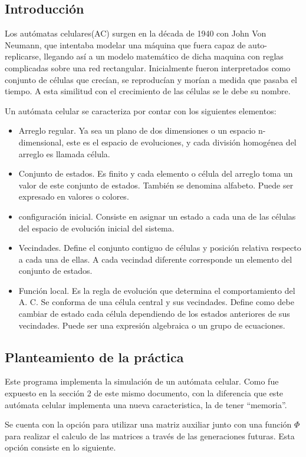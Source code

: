 \subsection{Introducción}
	Los autómatas celulares(AC) surgen en la década de 1940 con John Von Neumann, que intentaba modelar una máquina que fuera capaz de auto-replicarse, llegando así a un modelo matemático de dicha maquina con reglas complicadas sobre una red rectangular. Inicialmente fueron interpretados como conjunto de células que crecían, se reproducían y morían a medida que pasaba el tiempo. A esta similitud con el crecimiento de las células se le debe su nombre.\cite{PAGINA}

	Un autómata celular se caracteriza por contar con los siguientes elementos:
	\begin{itemize}
		\item Arreglo regular. Ya sea un plano de dos dimensiones o un espacio n-dimensional, este es el espacio de evoluciones, y cada división homogénea del arreglo es llamada célula.
		\item Conjunto de estados. Es finito y cada elemento o célula del arreglo toma un valor de este conjunto de estados. También se denomina alfabeto. Puede ser expresado en valores o colores.
		\item configuración inicial. Consiste en asignar un estado a cada una de las células del espacio de evolución inicial del sistema.
		\item Vecindades. Define el conjunto contiguo de células y posición relativa respecto a cada una de ellas. A cada vecindad diferente corresponde un elemento del conjunto de estados.
		\item Función local. Es la regla de evolución que determina el comportamiento del A. C. Se conforma de una célula central y sus vecindades. Define como debe cambiar de estado cada célula dependiendo de los estados anteriores de sus vecindades. Puede ser una expresión algebraica o un grupo de ecuaciones.
	\end{itemize}

\subsection{Planteamiento de la práctica}
	Este programa implementa la simulación de un autómata celular. Como fue expuesto en la sección 2 de este mismo documento, con la diferencia que este autómata celular implementa una nueva caracteristica, la de tener ``memoria''.

	Se cuenta con la opción para utilizar una matriz auxiliar junto con una función $\Phi$ para realizar el calculo de las matrices a través de las generaciones futuras. Esta opción consiste en lo siguiente.

